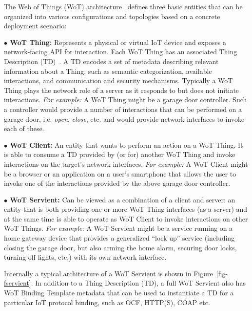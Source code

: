 The Web of Things (WoT) architecture~\cite{Wot2017arch} defines three basic entities
that can be organized into various configurations and topologies 
based on a concrete deployment scenario:

\noindent\textbf{$\bullet$ WoT Thing:} Represents a physical or virtual IoT device 
        and exposes a network-facing API for interaction.
	Each WoT Thing has an associated Thing Description (TD)~\cite{Wot2017td}. 
        A TD encodes a set of metadata describing relevant information about a Thing,
        such as semantic categorization, available interactions, and communication and security mechanisms.
        Typically a WoT Thing plays the network role of a server as it responds to
        but does not initiate interactions.
\emph{For example:} 
A WoT Thing might be a garage door controller.
Such a controller would provide a number of interactions that can be performed on a garage door, 
i.e. \textit{open}, \textit{close}, etc. and would provide network interfaces to invoke
each of these.

\noindent\textbf{$\bullet$ WoT Client:} An entity that wants to perform an action on a WoT Thing.
It is able to consume a TD provided by (or for) another WoT Thing and invoke interactions on 
the target's network interfaces.
\emph{For example:} 
A WoT Client might be a browser or an application on a user's smartphone
that allows the user to invoke one of the interactions provided by the above garage door controller. 

\noindent\textbf{$\bullet$ WoT Servient:} Can be viewed as a combination of a client and server:
        an entity that is both providing one or more WoT Thing interfaces (as a server) and
        at the same time is able to operate as WoT Client to invoke interactions on other WoT Things.
\emph{For example:} 
A WoT Servient might be a service running on a home gateway device 
that provides a generalized ``lock up'' service (including closing the garage door, but also 
arming the home alarm, securing door locks, turning off lights, etc.) with its own network interface.

Internally a typical architecture of a WoT Servient is shown in Figure~\ref{fig-fservient}. 
In addition to a Thing Description (TD), a full WoT Servient also has WoT Binding Template 
metadata that can be used to instantiate a TD for a particular IoT protocol binding, 
such as OCF, HTTP(S), COAP etc. 

